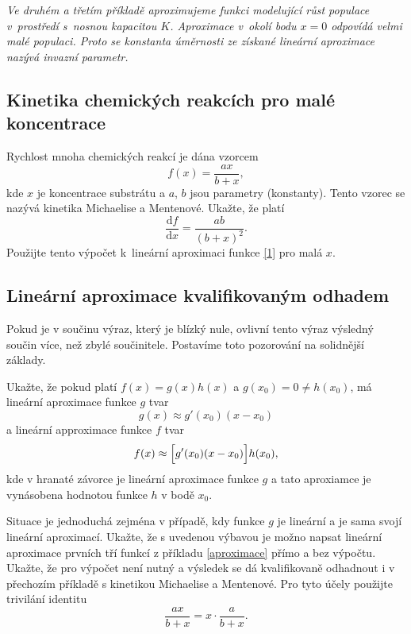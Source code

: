\textit{Ve druhém a třetím příkladě aproximujeme funkci modelující růst
populace v prostředí s nosnou kapacitou $K$. Aproximace v okolí bodu
$x=0$ odpovídá velmi malé populaci. Proto se konstanta úměrnosti ze
získané lineární aproximace nazývá \emph{invazní parametr}.
}

\stranka

\subsection{Kinetika chemických reakcích pro malé koncentrace} Rychlost mnoha chemických reakcí je dána vzorcem
\begin{equation}\label{1}
  f(x)=\frac {ax}{b+x},
\end{equation}
kde $x$ je koncentrace substrátu a $a$, $b$ jsou parametry (konstanty). Tento vzorec se nazývá kinetika  Michaelise a Mentenové. Ukažte, že platí
\begin{equation*}
  \frac{\mathrm df}{\mathrm dx}=\frac{ab}{(b+x)^2}.
\end{equation*}
Použijte tento výpočet k lineární aproximaci funkce \eqref{1} pro malá $x$.%

\stranka

\subsection{Lineární aproximace kvalifikovaným odhadem}

Pokud je v součinu výraz, který je blízký nule, ovlivní tento výraz výsledný součin více, než zbylé součinitele. Postavíme toto pozorování na solidnější základy.

Ukažte, že pokud platí $f(x)=g(x)h(x)$ a $g(x_0)=0\neq h(x_0)$, má lineární aproximace funkce $g$ tvar
$$g(x)\approx g'(x_0)(x-x_0)$$ a lineární approximace funkce $f$ tvar
$$f(x)\approx \Bigl[g'(x_0) (x-x_0)\Bigr]h(x_0),$$
kde v hranaté závorce je lineární aproximace funkce $g$ a tato aproxiamce je vynásobena hodnotou funkce $h$ v bodě $x_0$.

Situace je jednoduchá zejména v případě, kdy funkce $g$ je lineární a
je sama svojí lineární aproximací. Ukažte, že s uvedenou výbavou je možno
napsat lineární aproximace prvních tří funkcí z příkladu
\ref{aproximace} přímo a bez výpočtu. Ukažte, že pro výpočet není nutný a výsledek se dá kvalifikovaně odhadnout i v
přechozím příkladě s kinetikou Michaelise a Mentenové. Pro tyto účely použijte trivilání identitu
\begin{equation*}
  \frac {ax}{b+x}=x\cdot\frac {a}{b+x}.
\end{equation*}

